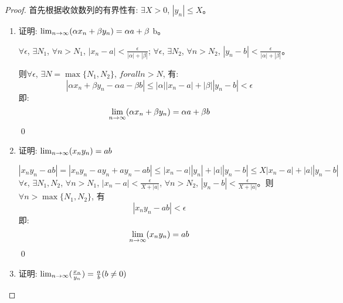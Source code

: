 \begin{proof}
    首先根据收敛数列的有界性有: $\exists X > 0$, $\left| y_n \right| \le X$。

    \begin{enumerate}
        \item 证明: $\lim_{n \to \infty } (\alpha x_n + \beta y_n) = \alpha a + \beta$ b。
        
        $\forall \epsilon$, $\exists N_1$, $\forall n > N_1$, $\left| x_n - a \right| < \frac{\epsilon}{|\alpha|+|\beta|}$; $\forall \epsilon$, $\exists N_2$, $\forall n > N_2$, $\left| y_n - b \right| < \frac{\epsilon}{|\alpha|+|\beta|}$。

        则$\forall \epsilon$, $\exists N = \max\{N_1, N_2\}$, $forall n > N$, 有:
        \begin{equation*}
            \left| \alpha x_n + \beta y_n - \alpha a - \beta b\right| \le |\alpha||x_n-a| + |\beta||y_n-b| < \epsilon
        \end{equation*}
        即:
        \begin{equation*}
            \lim_{n \to \infty } (\alpha x_n + \beta y_n) = \alpha a + \beta b
        \end{equation*}
        \qed
        \item 证明: $\lim_{n \to \infty } (x_n y_n) = ab$
        
        \begin{equation*}
            | x_ny_n - ab | = |x_ny_n - ay_n +ay_n - ab| \le | x_n - a||y_n| + |a||y_n - b| \le X|x_n-a| +|a||y_n-b| 
        \end{equation*}
        $\forall \epsilon$, $\exists N_1, N_2$, $\forall n > N_1$, $|x_n - a| < \frac{\epsilon}{X+|a|}$, $\forall n > N_2$, $|y_n - b| < \frac{\epsilon}{X+|a|}$。则$\forall n > \max\{N_1, N_2\}$, 有
        \begin{equation*}
            | x_ny_n - ab | < \epsilon
        \end{equation*}
        即:
        \begin{equation*}
            \lim_{n \to \infty } (x_n y_n) = ab
        \end{equation*}
        \qed
        \item 证明: $\lim_{n \to \infty } (\frac{x_n}{y_n}) = \frac{a}{b}(b \neq 0)$
        

\end{enumerate}
\end{proof}
